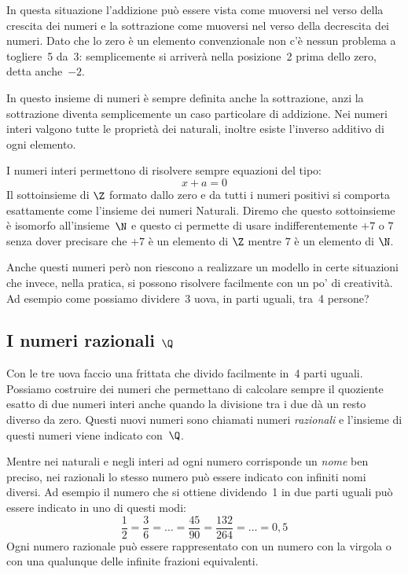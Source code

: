 In questa situazione l'addizione può essere vista come muoversi nel verso della 
crescita dei numeri e la sottrazione come muoversi nel verso della decrescita 
dei numeri. Dato che lo zero è un elemento convenzionale non c'è nessun problema 
a togliere~5 da~3: semplicemente si arriverà nella posizione~2 prima dello zero, 
detta anche~\(-2\).

In questo insieme di numeri è sempre definita anche la sottrazione, anzi la 
sottrazione diventa semplicemente un caso particolare di addizione.
Nei numeri interi valgono tutte le proprietà dei naturali, inoltre esiste 
l'inverso additivo di ogni elemento.

I numeri interi permettono di risolvere sempre equazioni del tipo: 
\[x+a=0\]
Il sottoinsieme di \(\Z\) formato dallo zero e da tutti i numeri positivi si 
comporta esattamente come l'insieme dei numeri Naturali. Diremo che questo 
sottoinsieme è isomorfo all'insieme~\(\N\) e questo ci permette di usare 
indifferentemente \(+7\) o \(7\) senza dover precisare che \(+7\) è un elemento 
di \(\Z\) mentre \(7\) è un elemento di \(\N\).

Anche questi numeri però non riescono a realizzare un modello in certe 
situazioni che invece, nella pratica, si possono risolvere facilmente con un 
po' di creatività. Ad esempio come possiamo dividere~3 uova, in parti uguali, 
tra~4 persone?

\subsection{I numeri razionali \(\Q\)} 
\label{subsec:insnum_razionali}

Con le tre uova faccio una frittata che divido facilmente in~4 parti uguali. 
Possiamo costruire dei numeri che permettano di calcolare sempre il quoziente 
esatto di due numeri interi anche quando la divisione tra i due dà un resto 
diverso da zero. Questi nuovi numeri sono chiamati numeri \emph{razionali} e 
l'insieme di questi numeri viene indicato con~\(\Q\).

Mentre nei naturali e negli interi ad ogni numero corrisponde un \emph{nome} ben 
preciso, nei razionali lo stesso numero può essere indicato con infiniti nomi 
diversi. Ad esempio il numero che si ottiene dividendo~1 in due parti uguali può 
essere indicato in uno di questi modi: 
\[\frac{1}{2}=\frac{3}{6}=\dots=\frac{45}{90}=\frac{132}{264}=\dots=0,5\]
Ogni numero razionale può essere rappresentato con un numero con la virgola o 
con una qualunque delle infinite frazioni equivalenti.

